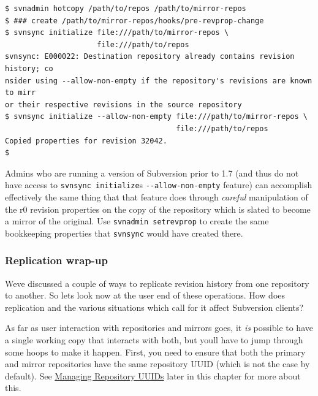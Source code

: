\begin{verbatim}
$ svnadmin hotcopy /path/to/repos /path/to/mirror-repos
$ ### create /path/to/mirror-repos/hooks/pre-revprop-change
$ svnsync initialize file:///path/to/mirror-repos \
                     file:///path/to/repos
svnsync: E000022: Destination repository already contains revision history; co
nsider using --allow-non-empty if the repository's revisions are known to mirr
or their respective revisions in the source repository
$ svnsync initialize --allow-non-empty file:///path/to/mirror-repos \
                                       file:///path/to/repos
Copied properties for revision 32042.
$
\end{verbatim}

Admins who are running a version of Subversion prior to 1.7 (and thus do
not have access to \texttt{svnsync\ initialize}\textquotesingle s
\texttt{-\/-allow-non-empty} feature) can accomplish effectively the
same thing that that feature does through \emph{careful} manipulation of
the r0 revision properties on the copy of the repository which is slated
to become a mirror of the original. Use \texttt{svnadmin\ setrevprop} to
create the same bookkeeping properties that \texttt{svnsync} would have
created there.

\subsubsection{Replication
wrap-up}\label{svn.reposadmin.maint.replication.wrapup}

We\textquotesingle ve discussed a couple of ways to replicate revision
history from one repository to another. So let\textquotesingle s look
now at the user end of these operations. How does replication and the
various situations which call for it affect Subversion clients?

As far as user interaction with repositories and mirrors goes, it
\emph{is} possible to have a single working copy that interacts with
both, but you\textquotesingle ll have to jump through some hoops to make
it happen. First, you need to ensure that both the primary and mirror
repositories have the same repository UUID (which is not the case by
default). See \hyperref[svn.reposadmin.maint.uuids]{Managing Repository
UUIDs} later in this chapter for more about this.

